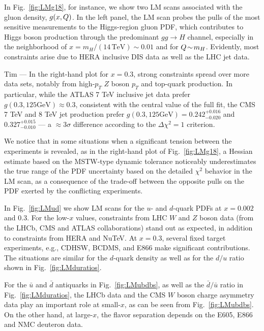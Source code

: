 In Fig.~\ref{fig:LMg18}, for instance, we show two LM scans associated
with the gluon density, $g(x,Q)$. In the left panel, the LM scan probes the pulls of the most sensitive measurements to the Higgs-region gluon PDF, which
contributes to Higgs boson production through the predominant $gg \to
H$ channel, especially in the neighborhood of $x = m_H /
(14\,\mathrm{TeV})\!\sim\! 0.01$ and for $Q\!\sim\!m_H$. Evidently,
most constraints arise due to HERA inclusive DIS data as well as the
LHC jet data. 

{\color{red} Tim ---
In the right-hand plot for $x=0.3$, strong constraints spread over more data
sets, notably from high-$p_T$ $Z$ boson $p_T$ and top-quark
production. In particular, while the ATLAS 7 TeV inclusive jet data
prefer $g(0.3,125\mbox {GeV})\approx 0.3$, consistent with
the central value of the full fit, the CMS 7 TeV and 8 TeV jet
production prefer $g(0.3,125\mbox {GeV}) = 0.242^{+0.016}_{-0.020}$
and $0.327^{+0.015}_{-0.010}$ --- a $\approx 3\sigma$ difference
according to the $\Delta \chi^2=1$ criterion.
}

We notice that in some situations when a significant tension
between the experiments is revealed, as in the right-hand plot of
Fig.~\ref{fig:LMg18}, a Hessian estimate based on the
MSTW-type dynamic tolerance \cite{Martin:2009iq}
noticeably underestimates the true range of the PDF uncertainty
based on the detailed $\chi^2$ behavior
in the LM scan, as a consequence of the trade-off between the opposite
pulls on the PDF exerted by the conflicting experiments. 

%
In Fig.~\ref{fig:LMud} we show LM scans for the $u$- and $d$-quark
PDFs at $x=0.002$ and $0.3$.
%
For the low-$x$ values, constraints from  LHC $W$ and $Z$ boson data 
(from the LHCb, CMS and ATLAS collaborations) stand out
as expected, in addition to constraints from HERA and NuTeV.
%
At $x=0.3$, several fixed target experiments, e.g., CDHSW, BCDMS, and
E866 make significant contributions.
%
The situations are similar for the $d$-quark density as well as for the $d/u$ ratio shown in Fig.~\ref{fig:LMduratios}.

For the $\bar u$ and $\bar d$ antiquarks in Fig.~\ref{fig:LMubdbs}, as
well as the  $\bar d/\bar u$ ratio in Fig.~\ref{fig:LMduratios},
the LHCb data and the CMS $W$ boson charge asymmetry data play an
important role at small-$x$, as can be seen from
Fig.~\ref{fig:LMubdbs}. 
%
On the other hand, at large-$x$, the flavor separation depends on the
E605, E866 and NMC deuteron data. 

